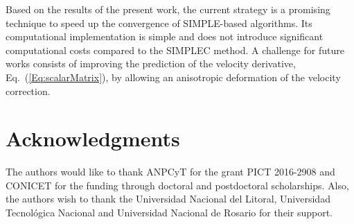\documentclass[final,3p,times,11pt,onecolumn]{myElsarticle}
\numberwithin{equation}{section}
\begin{document}
Based on the results of the present work, the current strategy is a promising technique to speed up the convergence of SIMPLE-based algorithms. Its computational implementation is simple and does not introduce significant computational costs compared to the SIMPLEC method. 
A challenge for future works consists of improving the prediction of the velocity derivative, Eq.~(\ref{Eq:scalarMatrix}), by allowing an anisotropic deformation of the velocity correction. %

\nolinenumbers
\section*{Acknowledgments}
The authors would like to thank ANPCyT for the grant PICT 2016-2908 and
CONICET for the funding through doctoral and postdoctoral scholarships. Also, the authors wish to thank the Universidad Nacional del Litoral, Universidad Tecnológica Nacional and Universidad Nacional de Rosario for their support. 



\end{document}
